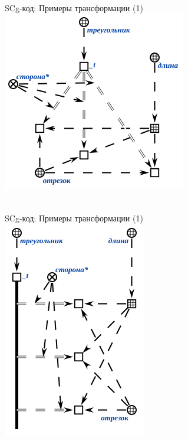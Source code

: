 \begin{frame}{\\SCg-код: Примеры трансформации (1)}
	\topline
	\justifying
	\vspace*{\fill}\\
	\vspace{10mm}
	\centering
	\includegraphics[scale=0.5]{./figures/intro/scg/examples/scg_examples_transf_1_3.png}
\end{frame}

\begin{frame}{\\SCg-код: Примеры трансформации (1)}
	\topline
	\justifying
	\vspace*{\fill}\\
	\vspace{10mm}
	\centering
	\includegraphics[scale=0.5]{./figures/intro/scg/examples/scg_examples_transf_1_4.png}
\end{frame}

